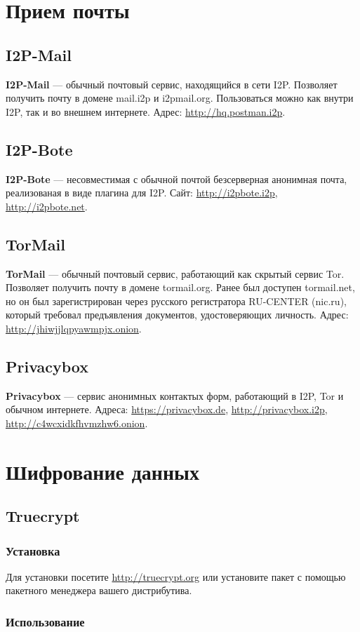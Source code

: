 \section{Прием почты}
\subsection{I2P-Mail}
\textbf{I2P-Mail} --- обычный почтовый сервис, находящийся в сети I2P. Позволяет получить почту в домене mail.i2p и i2pmail.org. Пользоваться можно как внутри I2P, так и во внешнем интернете. Адрес: \url{http://hq.postman.i2p}.
\subsection{I2P-Bote}
\textbf{I2P-Bote} --- несовместимая с обычной почтой безсерверная анонимная почта, реализованая в виде плагина для I2P. Сайт: \url{http://i2pbote.i2p}, \url{http://i2pbote.net}.
\subsection{TorMail}
\textbf{TorMail} --- обычный почтовый сервис, работающий как скрытый сервис Tor. Позволяет получить почту в домене tormail.org. Ранее был доступен tormail.net, но он был зарегистрирован через русского регистратора RU-CENTER (nic.ru), который требовал предъявления документов, удостоверяющих личность\cite{tormail}. Адрес: \url{http://jhiwjjlqpyawmpjx.onion}.
\subsection{Privacybox}
\textbf{Privacybox} --- сервис анонимных контактых форм, работающий в I2P, Tor и обычном интернете. Адреса: \url{https://privacybox.de}, \url{http://privacybox.i2p}, \url{http://c4wcxidkfhvmzhw6.onion}.

\section{Шифрование данных}
\subsection{Truecrypt}
\subsubsection{Установка}
Для установки посетите \url{http://truecrypt.org} или установите пакет с помощью пакетного менеджера вашего дистрибутива.
\subsubsection{Использование}
